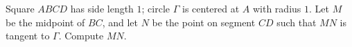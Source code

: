 Square $ABCD$ has side length $1$; circle $\Gamma$ is centered at $A$ with radius $1$. Let $M$ be the midpoint of $BC$, and let $N$ be the point on segment $CD$ such that $MN$ is tangent to $\Gamma$. Compute $MN$.